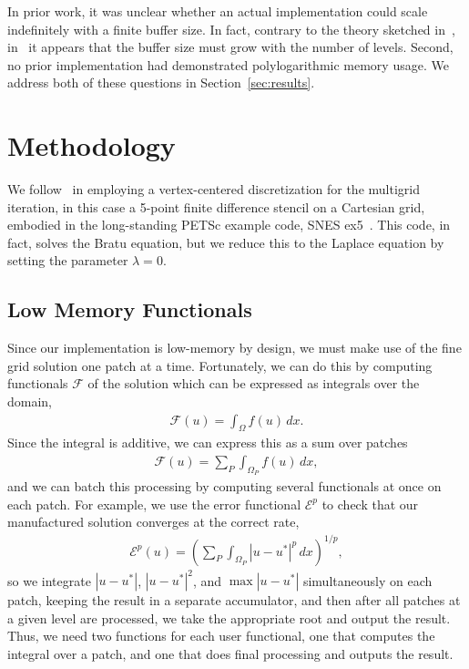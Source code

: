In prior work, it was unclear whether an actual implementation could scale indefinitely with a finite buffer size. In
fact, contrary to the theory sketched in~\cite{BrandtDiskin1994}, in~\cite{AdamsBrownKnepleySamtaney2016} it appears
that the buffer size must grow with the number of levels. Second, no prior implementation had demonstrated
polylogarithmic memory usage. We address both of these questions in Section~\ref{sec:results}.

\section{Methodology}

We follow~\cite{BrandtDiskin1994} in employing a vertex-centered discretization for the multigrid iteration, in this
case a 5-point finite difference stencil on a Cartesian grid, embodied in the long-standing PETSc example code, SNES
ex5~\cite{petsc-user-ref}. This code, in fact, solves the Bratu equation, but we reduce this to the Laplace equation by
setting the parameter $\lambda = 0$.

\subsection{Low Memory Functionals}

Since our implementation is low-memory by design, we must make use of the fine grid solution one patch at a
time. Fortunately, we can do this by computing functionals $\mathcal{F}$ of the solution which can be expressed as
integrals over the domain,
\begin{align}
  \mathcal{F}(u) = \int_\Omega f(u)\,dx.
\end{align}
Since the integral is additive, we can express this as a sum over patches
\begin{align}
  \mathcal{F}(u) = \sum_P \int_{\Omega_P} f(u)\,dx,
\end{align}
and we can batch this processing by computing several functionals at once on each patch. For example, we use the error
functional $\mathcal{E}^p$ to check that our manufactured solution converges at the correct rate,
\begin{align}
  \mathcal{E}^p(u) = \left( \sum_P \int_{\Omega_P} |u - u^*|^p\,dx \right)^{1/p},
\end{align}
so we integrate $|u - u^*|$, $|u - u^*|^2$, and $\max |u - u^*|$ simultaneously on each patch, keeping the result in a
separate accumulator, and then after all patches at a given level are processed, we take the appropriate root and output
the result. Thus, we need two functions for each user functional, one that computes the integral over a patch, and one
that does final processing and outputs the result.

